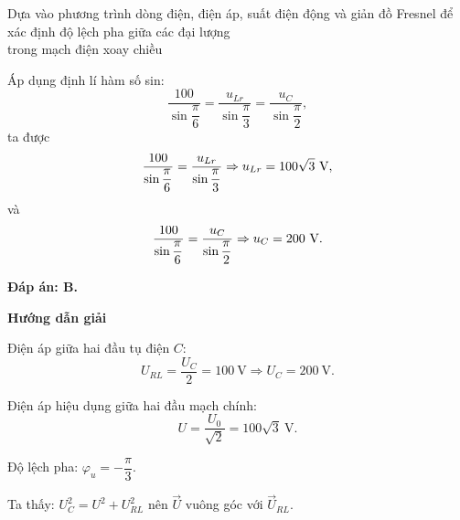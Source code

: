 \begin{dang}{Dựa vào phương trình dòng điện, điện áp, suất điện động  và giản đồ Fresnel để xác định độ lệch pha giữa các đại lượng\\ trong mạch điện xoay chiều}
{		Áp dụng định lí hàm số sin:
		\begin{equation*}
			\dfrac{100}{\sin \dfrac{\pi}{6}} = \dfrac{u_{Lr}}{\sin\dfrac{\pi}{3}} = \dfrac{u_{C}}{\sin \dfrac{\pi}{2}},
		\end{equation*}
		ta được
		\begin{equation*}
			\dfrac{100}{\sin \dfrac{\pi}{6}} = \dfrac{u_{Lr}}{\sin\dfrac{\pi}{3}} \Rightarrow u_{Lr} = 100\sqrt 3\ \text V,
		\end{equation*}
		và 
		\begin{equation*}
			\dfrac{100}{\sin \dfrac{\pi}{6}} = \dfrac{u_{C}}{\sin \dfrac{\pi}{2}} \Rightarrow u_{C} = 200\ \text V.
		\end{equation*}
		
		\textbf{Đáp án: B.}
	}
	
	{
		\begin{center}
			\textbf{Hướng dẫn giải}
		\end{center}
		Điện áp giữa hai đầu tụ điện $C$:
		$$U_{RL} =\dfrac{U_C}{2} = 100\ \text{V} \Rightarrow U_C = 200\ \text{V}.$$
		
		Điện áp hiệu dụng giữa hai đầu mạch chính:
		$$U=\dfrac{U_0}{\sqrt 2} = 100\sqrt 3\ \text{V}.$$
		
		Độ lệch pha: $\varphi_u = -\dfrac{\pi}{3}$.
		
		Ta thấy: $U_C^2 =U^2 +U^2_{RL}$ nên $\vec U$ vuông góc với $\vec U _{RL}$.
		
}
\end{dang}
